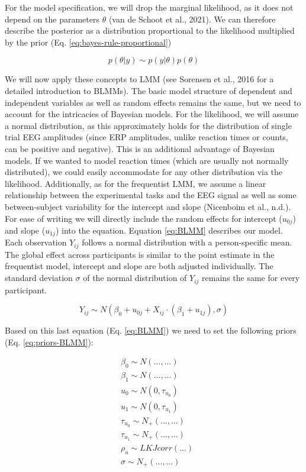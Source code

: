 \documentclass[
  doc,12pt,floatsintext]{apa7}
\begin{document}
For the model specification, we will drop the marginal likelihood, as it does not depend on the parameters \(\theta\) (van de Schoot et al., 2021). We can therefore describe the posterior as a distribution proportional to the likelihood multiplied by the prior (Eq. \eqref{eq:bayes-rule-proportional})

\begin{equation}
p(\theta|y) \sim p(y|\theta)p(\theta)
\label{eq:bayes-rule-proportional}
\end{equation}

We will now apply these concepts to LMM (see Sorensen et al., 2016 for a detailed introduction to BLMMs). The basic model structure of dependent and independent variables as well as random effects remains the same, but we need to account for the intricacies of Bayesian models. For the likelihood, we will assume a normal distribution, as this approximately holds for the distribution of single trial EEG amplitudes (since ERP amplitudes, unlike reaction times or counts, can be positive and negative). This is an additional advantage of Bayesian models. If we wanted to model reaction times (which are usually not normally distributed), we could easily accommodate for any other distribution via the likelihood. Additionally, as for the frequentist LMM, we assume a linear relationship between the experimental tasks and the EEG signal as well as some between-subject variability for the intercept and slope (Nicenboim et al., n.d.). For ease of writing we will directly include the random effects for intercept (\(u_{0j}\)) and slope (\(u_{1j}\)) into the equation. Equation \eqref{eq:BLMM} describes our model. Each observation \(Y_{ij}\) follows a normal distribution with a person-specific mean. The global effect across participants is similar to the point estimate in the frequentist model, intercept and slope are both adjusted individually. The standard deviation \(\sigma\) of the normal distribution of \(Y_{ij}\) remains the same for every participant.

\begin{equation}
Y_{ij} \sim N(\beta_{0} + u_{0j} + X_{ij} \cdot (\beta_{1} + u_{1j}), \sigma)
\label{eq:BLMM}
\end{equation}

Based on this last equation (Eq. \eqref{eq:BLMM}) we need to set the following priors (Eq. \eqref{eq:priors-BLMM}):

\begin{equation}
\begin{split}
& \beta_{0} \sim N(...,...) \\
& \beta_{1} \sim N(...,...) \\
& u_0 \sim N(0,\tau_{u_0}) \\
& u_1 \sim N(0,\tau_{u_1}) \\
& \tau_{u_0} \sim N_+(...,...) \\
& \tau_{u_1} \sim N_+(...,...) \\
& \rho_u \sim LKJcorr(...) \\
& \sigma \sim N_+(...,...)
\end{split}
\label{eq:priors-BLMM}
\end{equation}
\end{document}
